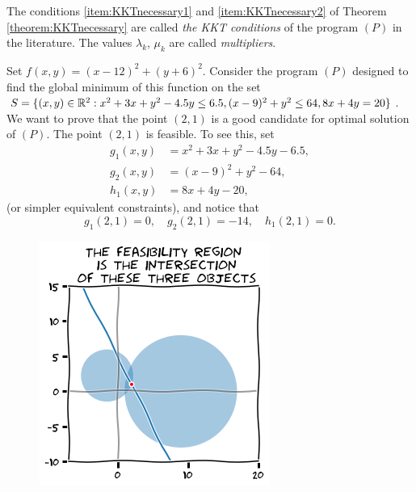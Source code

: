 \begin{remark}
The conditions \ref{item:KKTnecessary1} and \ref{item:KKTnecessary2} of Theorem \ref{theorem:KKTnecessary} are called \emph{the KKT conditions} of the program $(P)$ in the literature.   The values $\lambda_k$, $\mu_k$ are called \emph{multipliers}.
\end{remark}

\begin{example}\label{example:feasibleP3}
Set $f(x,y)=(x-12)^2+(y+6)^2$.  Consider the program $(P)$ designed to find the global minimum of this function on the set $S=\{ (x,y) \in \mathbb{R}^2 : x^2+3x+y^2-4.5y \leq 6.5, (x-9)^2 +y^2 \leq 64, 8x+4y=20 \}$.  We want to prove that the point $(2,1)$ is a good candidate for optimal solution of $(P)$.
The point $(2,1)$ is feasible.  To see this, set 
\begin{align*}
g_1(x,y) &=x^2+3x+y^2-4.5y-6.5, \\
g_2(x,y) &=(x-9)^2+y^2-64, \\
h_1(x,y) &=8x+4y-20,
\end{align*}
(or simpler equivalent constraints), and notice that
\begin{equation*}
g_1(2,1)=0, \quad g_2(2,1)=-14, \quad h_1(2,1)=0.
\end{equation*}
\begin{figure}[ht!]
\includegraphics[width=0.5\linewidth]{images/feasibleP3.png}


\end{figure}
\end{example}
